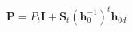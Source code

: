 \documentclass[12pt]{article}
\begin{document}
$$
\mathbf P = P_t \mathbf I + {\mathbf S_t} \left( \mathbf h_0^{-1} \right)^t \mathbf h_{0d}
$$
\end{document}
